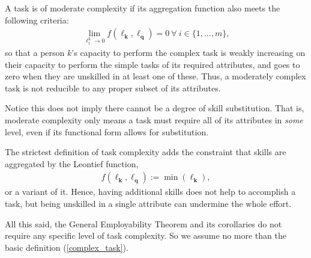 \documentclass[hidelinks, nonatbib]{elsarticle}
\begin{document}
\begin{definition}
    \begin{subdefinition}
        A task is of moderate complexity if its aggregation function also meets the following criteria:
        \begin{gather}
            \lim_{
                \ell_{i}^{k}
                \rightarrow 0
            }{
                f(\boldsymbol{\ell_k}, \boldsymbol{\ell_q})
            }
            = 0
            \
            \forall 
            \
            i \in \{1, \dots, m\}
            ,
        \end{gather}
        so that a person $k$'s capacity to perform the complex task is weakly increasing on their capacity to perform the simple tasks of its required attributes, and goes to zero when they are unskilled in at least one of these. Thus, a moderately complex task is not reducible to any proper subset of its attributes.
        
        Notice this does not imply there cannot be a degree of skill substitution. That is, moderate complexity only means a task must require all of its attributes in \textit{some} level, even if its functional form allows for substitution.
    \end{subdefinition}
    
    \begin{subdefinition}
        The strictest definition of task complexity adds the constraint that skills are aggregated by the Leontief function,
        \begin{gather}
            f(\boldsymbol{\ell_k}, \boldsymbol{\ell_q})
            :=
            \min(\boldsymbol{\ell_k})
            ,
        \end{gather}
        or a variant of it. Hence, having additional skills does not help to accomplish a task, but being unskilled in a single attribute can undermine the whole effort.
    \end{subdefinition}

\end{definition}
All this said, the General Employability Theorem and its corollaries do not require any specific level of task complexity. So we assume no more than the basic definition (\ref{complex_task}). 
\end{document}
